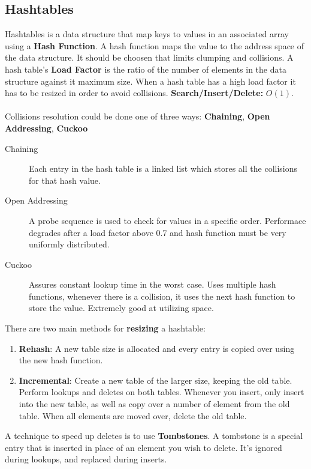 \documentclass{article}
\begin{document}
\subsection{Hashtables}
Hashtables is a data structure that map keys to values in an associated array using a {\bf Hash Function}. A hash function maps the value to the address space of the data structure. It should be choosen that limits clumping and collisions. A hash table's {\bf Load Factor} is the ratio of the number of elements in the data structure against it maximum size. When a hash table has a high load factor it has to be resized in order to avoid collisions. {\bf Search/Insert/Delete:} $O(1)$.
\\ \\
Collisions resolution could be done one of three ways: {\bf Chaining}, {\bf Open Addressing}, {\bf Cuckoo}
\begin{description}
	\item[Chaining] Each entry in the hash table is a linked list which stores all the collisions for that hash value.
	\item[Open Addressing] A probe sequence is used to check for values in a specific order. Performace degrades after a load factor above 0.7 and hash function must be very uniformly distributed.
	\item[Cuckoo] Assures constant lookup time in the worst case. Uses multiple hash functions, whenever there is a collision, it uses the next hash function to store the value. Extremely good at utilizing space.
\end{description}
There are two main methods for {\bf resizing} a hashtable:
\begin{enumerate}
	\item {\bf Rehash}: A new table size is allocated and every entry is copied over using the new hash function.
	\item {\bf Incremental}: Create a new table of the larger size, keeping the old table. Perform lookups and deletes on both tables. Whenever you insert, only insert into the new table, as well as copy over a number of element from the old table. When all elements are moved over, delete the old table.
\end{enumerate}
A technique to speed up deletes is to use {\bf Tombstones}. A tombstone is a special entry that is inserted in place of an element you wish to delete. It's ignored during lookups, and replaced during inserts.


\clearpage
\end{document}

